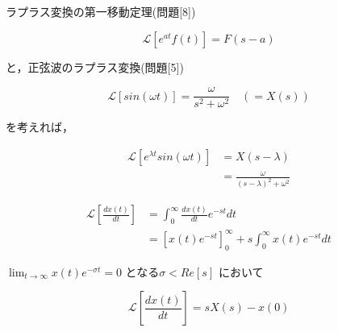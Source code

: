\documentclass[a4paper,12pt]{article}
\begin{document}
\begin{tcolorbox}[title={[10] \( e^{\lambda t} sin(\omega t) \) をラプラス変換せよ． }]

  \quad ラプラス変換の第一移動定理(問題[8])

  \[
      \mathcal{L} \left[ e^{at} f(t) \right] = F(s - a)
  \]

  と，正弦波のラプラス変換(問題[5])

  \[
      \mathcal{L} \left[ sin(\omega t) \right] = \frac{\omega}{ s^2+ {\omega}^2} \quad \left( = X(s) \right)
  \]

  を考えれば，


  \vspace{-3mm}
  \begin{align*}
      \mathcal{L} \left[ e^{\lambda t} sin(\omega t) \right] &=
      X(s - \lambda) \\
      &=\frac{\omega}{ \left(s - \lambda \right)^2+ {\omega}^2}
  \end{align*}

  \vspace{2mm}
\vspace{2mm}
  \end{tcolorbox}
\begin{tcolorbox}[title={[11] 時間関数 \( x(t) \) の微分をラプラス変換せよ． }]

  \begin{align*}
    \mathcal{L} \left[ \frac{dx(t)}{dt} \right] 
    &= \int_0^{\infty} \frac{dx(t)}{dt} e^{-st} dt \\
    &= \left[ x(t) e^{-st} \right]_{0}^{\infty}
    + s \int_0^{\infty} x(t) e^{-st} dt
\end{align*}

\quad \( \displaystyle \lim_{t \to \infty} x(t) e^{- \sigma t} = 0 \) となる\( \sigma < Re[s] \) において

\[
    \mathcal{L} \left[ \frac{dx(t)}{dt} \right] = sX(s) - x(0)
\]

\vspace{2mm}




\vspace{2mm}
  \end{tcolorbox}
\end{document}
